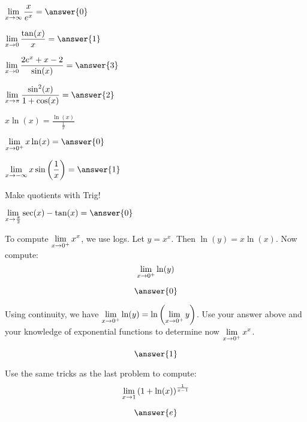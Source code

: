 \documentclass{ximera}
\begin{document}
    \begin{problem}
     $\dlim_{x \to \infty} \df{x}{e^x} = \answer{0}$
    \end{problem}
    \begin{problem}
     $\dlim_{x \to 0} \df{\tan(x)}{x} = \answer{1}$
    \end{problem}
    \begin{problem}
     $\dlim_{x \to 0} \df{2e^x + x - 2}{\sin(x)} = \answer{3}$
    \end{problem}
    \begin{problem}
     $\dlim_{x \to \pi} \df{\sin^2(x)}{1+\cos(x)} = \answer{2}$
    \end{problem}
    \begin{problem}
    \begin{hint}
    $x\ln(x) = \frac{\ln(x)}{\frac{1}{x}}$
    \end{hint}
    $\dlim_{x \to 0^+} x \ln(x) = \answer{0}$
    \end{problem}
    \begin{problem}
    $\dlim_{x \to -\infty} x\sin\left(\frac{1}{x}\right) = \answer{1}$
    \end{problem}
    \begin{problem}
    \begin{hint}
    Make quotients with Trig!
    \end{hint}
    $\dlim_{x \to \frac{\pi}{2}} \sec(x) - \tan(x) = \answer{0}$
    \end{problem}

    \begin{problem}
    To compute $\displaystyle \lim_{x \to 0^+} x^x$, we use logs. Let $y=x^x$. Then $\ln(y) = x \ln(x)$. Now compute:
    \[
        \displaystyle \lim_{x \to 0^+} \ln(y)
    \]


    $$\answer{0}$$


    Using continuity, we have $\displaystyle \lim_{x \to 0^+} \ln(y) = \ln\left(\displaystyle \lim_{x \to 0^+} y\right)$. Use your answer above and your knowledge of exponential functions to determine now $\displaystyle \lim_{x \to 0^+} x^x$.

    $$\answer{1}$$

    \end{problem}

    \begin{problem}
Use the same tricks as the last problem to compute:
        \[
            \displaystyle \lim_{x \to 1} \left(1+\ln(x)\right)^{\frac{1}{x-1}}
        \]

    $$\answer{e}$$
     \end{problem}
\end{document}
